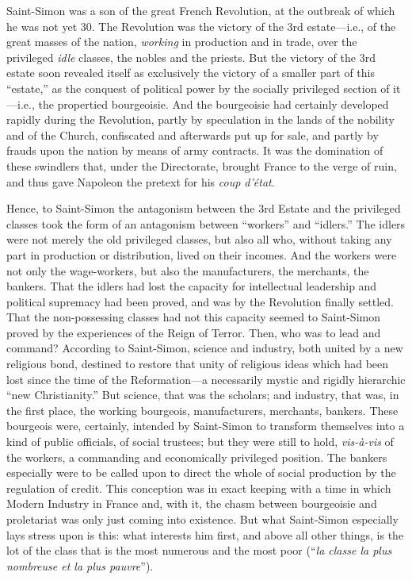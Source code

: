 Saint-Simon was a son of the great French Revolution, at the outbreak of which
he was not yet 30. The Revolution was the victory of the 3rd estate---i.e., of
the great masses of the nation, \emph{working} in production and in trade, over
the privileged \emph{idle} classes, the nobles and the priests. But the victory
of the 3rd estate soon revealed itself as exclusively the victory of a smaller
part of this ``estate,'' as the conquest of political power by the socially
privileged section of it---i.e., the propertied bourgeoisie. And the bourgeoisie
had certainly developed rapidly during the Revolution, partly by speculation in
the lands of the nobility and of the Church, confiscated and afterwards put up
for sale, and partly by frauds upon the nation by means of army contracts. It
was the domination of these swindlers that, under the Directorate, brought
France to the verge of ruin, and thus gave Napoleon the pretext for his
\emph{coup d'état}.

Hence, to Saint-Simon the antagonism between the 3rd Estate and the privileged
classes took the form of an antagonism between ``workers'' and ``idlers.'' The
idlers were not merely the old privileged classes, but also all who, without
taking any part in production or distribution, lived on their incomes. And the
workers were not only the wage-workers, but also the manufacturers, the
merchants, the bankers. That the idlers had lost the capacity for intellectual
leadership and political supremacy had been proved, and was by the Revolution
finally settled. That the non-possessing classes had not this capacity seemed to
Saint-Simon proved by the experiences of the Reign of Terror. Then, who was to
lead and command? According to Saint-Simon, science and industry, both united by
a new religious bond, destined to restore that unity of religious ideas which
had been lost since the time of the Reformation---a necessarily mystic and
rigidly hierarchic ``new Christianity.'' But science, that was the scholars; and
industry, that was, in the first place, the working bourgeois, manufacturers,
merchants, bankers. These bourgeois were, certainly, intended by Saint-Simon to
transform themselves into a kind of public officials, of social trustees; but
they were still to hold, \emph{vis-à-vis} of the workers, a commanding and
economically privileged position. The bankers especially were to be called upon
to direct the whole of social production by the regulation of credit. This
conception was in exact keeping with a time in which Modern Industry in France
and, with it, the chasm between bourgeoisie and proletariat was only just coming
into existence. But what Saint-Simon especially lays stress upon is this: what
interests him first, and above all other things, is the lot of the class that is
the most numerous and the most poor (``\emph{la classe la plus nombreuse et la
plus pauvre}'').

